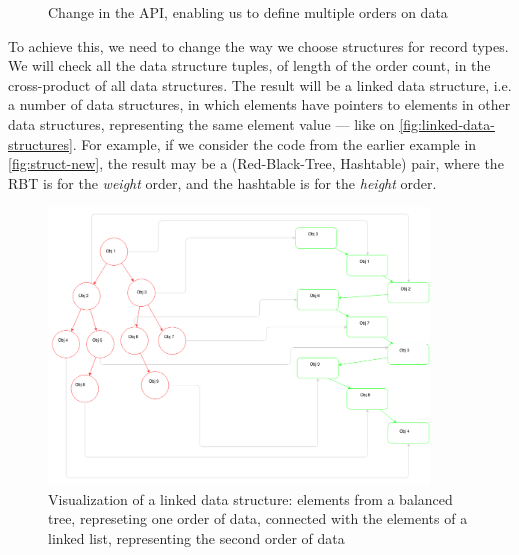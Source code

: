 \documentclass[a4paper,11pt]{article}
\begin{document}
            \begin{figure}[h!]
				

				\caption{Change in the API, enabling us to define multiple orders on data}

				\label{fig:struct-api-change}
			\end{figure}

            To achieve this, we need to change the way we choose structures for record types. We will check all
            the data structure tuples, of length of the order count, in the cross-product of all data structures. The
            result will be a linked data structure, i.e. a number of data structures, in which elements have pointers to
            elements in other data structures, representing the same element value --- like on
            \autoref{fig:linked-data-structures}. For example, if we consider the code from the earlier example in
            \autoref{fig:struct-new}, the result may be a (Red-Black-Tree, Hashtable) pair, where the RBT is for the \emph{weight}
            order, and the hashtable is for the \emph{height} order.

            \begin{figure}[h!]
                \begin{center}
                    \includegraphics[width=0.9\textwidth]{thesis-pics/linked-dses.png}
                \end{center}

				\caption{Visualization of a linked data structure: elements from a balanced tree, represeting one order of data,
                 connected with the elements of a linked list, representing the second order of data}
				\label{fig:linked-data-structures}
			\end{figure}
\end{document}
